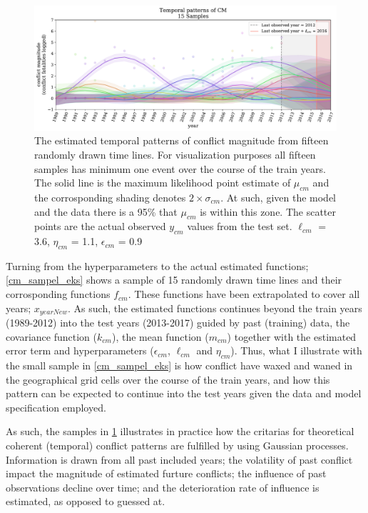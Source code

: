 \documentclass[a4paper]{article}
\begin{document}
\begin{figure}[!htb]
	\centering
	\includegraphics[scale=0.47]{cm_15_samples.pdf}
    \caption{\footnotesize{The estimated temporal patterns of conflict magnitude from fifteen randomly drawn time lines. For visualization purposes all fifteen samples has minimum one event over the course of the train years. The solid line is the maximum likelihood point estimate of $\mu_{cm}$ and the corrosponding shading denotes $2\times\sigma_{cm}$. At such, given the model and the data there is a 95\% that $\mu_{cm}$ is within this zone. The scatter points are the actual observed $y_{cm}$ values from the test set. $\ell_{cm}$ = 3.6, $\eta_{cm}$ = 1.1, $\epsilon_{cm}$ = 0.9}\label{cm_sampel_eks}}
\end{figure}

Turning from the hyperparameters to the actual estimated functions; \autoref{cm_sampel_eks} shows a sample of 15 randomly drawn time lines and their corrosponding functions $f_{cm}$. These functions have been extrapolated to cover all years; $x_{yearNew}$. As such, the estimated functions continues beyond the train years (1989-2012) into the test years (2013-2017) guided by past (training) data, the covariance function ($k_{cm}$), the mean function ($m_{cm}$) together with the estimated error term and hyperparameters ($\epsilon_{cm}$, $\ell_{cm}$ and $\eta_{cm}$). Thus, what I illustrate with the small sample in \autoref{cm_sampel_eks} is how conflict have waxed and waned in the geographical grid cells over the course of the train years, and how this pattern can be expected to continue into the test years given the data and model specification employed.\par 

As such, the samples in \ref{cm_sampel_eks} illustrates in practice how the critarias for theoretical coherent (temporal) conflict patterns are fulfilled by using Gaussian processes. Information is drawn from all past included years; the volatility of past conflict impact the magnitude of estimated furture conflicts; the influence of past observations decline over time; and the deterioration rate of influence is estimated, as opposed to guessed at.\par
\end{document}
